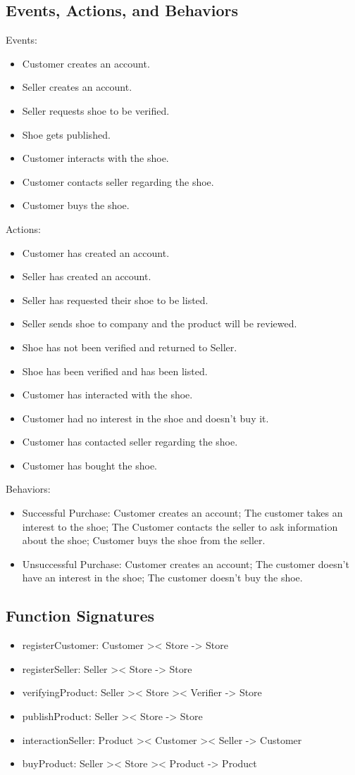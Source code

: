 \subsection{Events, Actions, and Behaviors}
Events:
\begin{itemize}
  \item Customer creates an account.
  \item Seller creates an account.
  \item Seller requests shoe to be verified.
  \item Shoe gets published.
  \item Customer interacts with the shoe.
  \item Customer contacts seller regarding the shoe.
  \item Customer buys the shoe.
\end{itemize}
Actions:
\begin{itemize}
  \item Customer has created an account.
  \item Seller has created an account.
  \item Seller has requested their shoe to be listed.
  \item Seller sends shoe to company and the product will be reviewed.
  \item Shoe has not been verified and returned to Seller.
  \item Shoe has been verified and has been listed.
  \item Customer has interacted with the shoe.
  \item Customer had no interest in the shoe and doesn't buy it.
  \item Customer has contacted seller regarding the shoe.
  \item Customer has bought the shoe.
\end{itemize}
Behaviors:
\begin{itemize}
  \item Successful Purchase: Customer creates an account; The customer takes an interest to the shoe; The Customer contacts the seller to ask information about the shoe; Customer buys the shoe from the seller.
  \item Unsuccessful Purchase: Customer creates an account; The customer doesn't have an interest in the shoe; The customer doesn't buy the shoe.
\end{itemize}
\subsection{Function Signatures}
\begin{itemize}
  \item registerCustomer: Customer >< Store -> Store
  \item registerSeller: Seller >< Store -> Store
  \item verifyingProduct: Seller >< Store >< Verifier -> Store
  \item publishProduct: Seller >< Store -> Store
  \item interactionSeller: Product >< Customer >< Seller -> Customer
  \item buyProduct: Seller >< Store >< Product -> Product
\end{itemize}
\newpage
